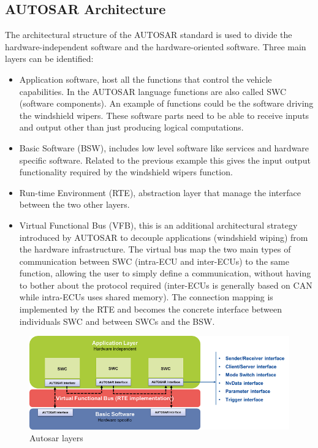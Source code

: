 \documentclass[../main.tex]{subfiles}
\begin{document}
\subsection{AUTOSAR Architecture}
The architectural structure of the \gls{AUTOSAR} standard is used to divide the hardware-independent software and the hardware-oriented software. Three main layers can be identified:
\begin{itemize}
    \item Application software, host all the functions that control the vehicle capabilities. In the \gls{AUTOSAR} language functions are also called \gls{SWC} (software components). An example of functions could be the software driving the windshield wipers. These software parts need to be able to receive inputs and output other than just producing logical computations.
    \item Basic Software (\gls{BSW}), includes low level software like services and hardware specific software. Related to the previous example this gives the input output functionality required by the windshield wipers function. 
    \item Run-time Environment (\gls{RTE}), abstraction layer that manage the interface between the two other layers. 
    \item Virtual Functional Bus (\gls{VFB}), this is an additional architectural strategy introduced by \gls{AUTOSAR} to decouple applications (windshield wiping) from the hardware infrastructure. The virtual bus map the two main types of communication between \gls{SWC} (intra-\gls{ECU} and inter-\gls{ECU}s) to the same function, allowing the user to simply define a communication, without having to bother about the protocol required (inter-\gls{ECU}s is generally based on \gls{CAN} while intra-\gls{ECU}s uses shared memory). The connection mapping is implemented by the RTE and becomes the concrete interface between individuals \gls{SWC} and between \gls{SWC}s and the \gls{BSW}.
\end{itemize}

\begin{figure}[h]
    \centering
    \includegraphics[width=\linewidth]{images_folder/878x-autosar_layers.b68.png}
    \caption{Autosar layers}
    \label{fig:AUTLAY}
\end{figure}
\end{document}
